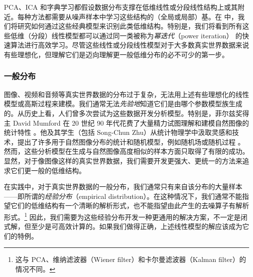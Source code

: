 \documentclass[../../book-main_zh.tex]{subfiles}
\begin{document}
PCA、ICA
和字典学习都假设数据分布支撑在低维线性或分段线性结构上或其附近。每种方法都需要从噪声样本中学习这些结构的（全局或局部）基。在
中，我们将研究如何通过这些经典模型来识别此类低维结构。特别是，我们将看到所有这些低维（分段）线性模型都可以通过同一类被称为\textit{幂迭代}（power
iteration）\cite{Zhai-2020}
的快速算法进行高效学习。尽管这些线性或分段线性模型对于大多数真实世界数据来说有些理想化，但理解它们是迈向理解更一般低维分布的必不可少的第一步。

\subsubsection{一般分布}\label{sec:denoising-intro}

图像、视频和音频等真实世界数据的分布过于复杂，无法用上述有些理想化的线性模型或高斯过程来建模。我们通常无法\textit{先验地}知道它们是由哪个参数模型族生成的。从历史上看，人们曾多次尝试为这些数据开发分析模型。特别是，菲尔兹奖得主
David Mumford 在 20 世纪 90 年代花费了大量精力试图理解和建模自然图像的统计特性
\cite{Mumford1996TheSD}。他及其学生（包括 Song-Chun
Zhu）从统计物理学中汲取灵感和技术，提出了许多用于自然图像分布的统计和随机模型，例如随机场或随机过程
\cite{Zhu-Entropy-1997,Zhu1997LearningGP,Zhu1997Prior,Huang-Mumford,Mumford-1999,Lee-Mumford}。然而，这些分析模型在生成与自然图像高度相似的样本方面只取得了有限的成功。显然，对于像图像这样的真实世界数据，我们需要开发更强大、更统一的方法来追求它们更一般的低维结构。

在实践中，对于真实世界数据的一般分布，我们通常只有来自该分布的大量样本——即所谓的\textit{经验分布}（empirical
distribution）。在这种情况下，我们通常不能指望它们的低维结构有一个清晰的解析形式，也不能指望由此产生的去噪算子有解析形式。\footnote{这与
PCA、维纳滤波器（Wiener filter）和卡尔曼滤波器（Kalman filter）的情况不同。}
因此，我们需要为这些经验分布开发一种更通用的解决方案，不一定是闭式解，但至少是可高效计算的。如果我们做得正确，上述线性模型的解应该成为它们的特例。
\end{document}
